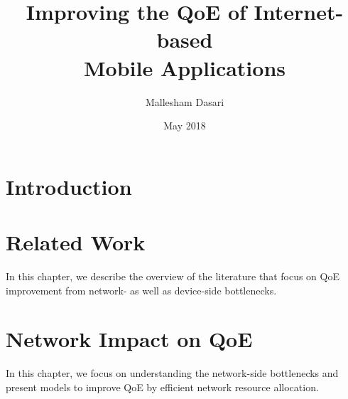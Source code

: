\documentclass[12pt]{cmuthesis}
\begin{document}
 
\frontmatter

\pagestyle{empty}

\title{ %
{\bf Improving the QoE of Internet-based \\ Mobile Applications}}
\author{Mallesham Dasari}
\date{May 2018}
\trnumber{}



\maketitle
\pagestyle{plain} %


\begin{abstract}
    
\end{abstract}



\tableofcontents
\color{blue}
\color{black}
\mainmatter

\chapter{Introduction}

\chapter{Related Work}
In this chapter, we describe the overview of the literature that focus on QoE improvement from network- as well as device-side bottlenecks.


\chapter{Network Impact on QoE}
In this chapter, we focus on understanding the network-side bottlenecks and present models to improve QoE by efficient network resource allocation.








\end{document}
